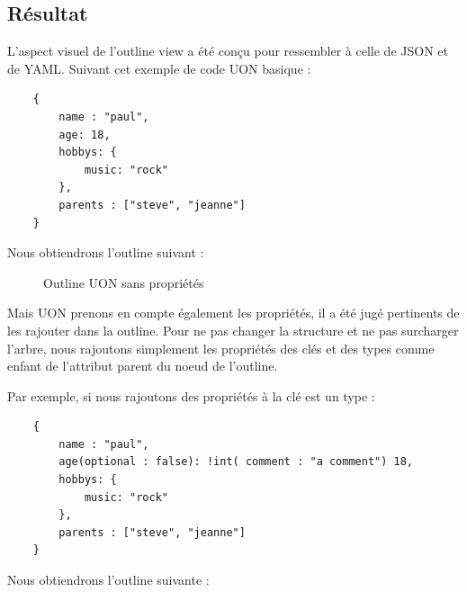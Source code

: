 \documentclass[
    iict, %
    il, %
]{heig-tb}
\begin{document}
\subsection{Résultat}
L'aspect visuel de l'outline view a été conçu pour ressembler à celle de JSON et de YAML.
Suivant cet exemple de code UON basique :

\begin{lstlisting}
    {
        name : "paul",
        age: 18,
        hobbys: {
            music: "rock"
        },
        parents : ["steve", "jeanne"]
    }
\end{lstlisting}

Nous obtiendrons l'outline suivant :

\begin{figure}[!h]
    \begin{center}
    \end{center}
    \caption[Outline UON sans propriétés]{\label{uon-payload-outline-without-properties} Outline UON sans propriétés}
\end{figure}

Mais UON prenons en compte également les propriétés, il a été jugé pertinents de les rajouter dans la outline.
Pour ne pas changer la structure et ne pas surcharger l'arbre,
nous rajoutons simplement les propriétés des clés et des types comme enfant de l'attribut parent du noeud de l'outline.

Par exemple, si nous rajoutons des propriétés à la clé est un type :
\begin{lstlisting}
    {
        name : "paul",
        age(optional : false): !int( comment : "a comment") 18,
        hobbys: {
            music: "rock"
        },
        parents : ["steve", "jeanne"]
    }
\end{lstlisting}

Nous obtiendrons l'outline suivante :
\end{document}

